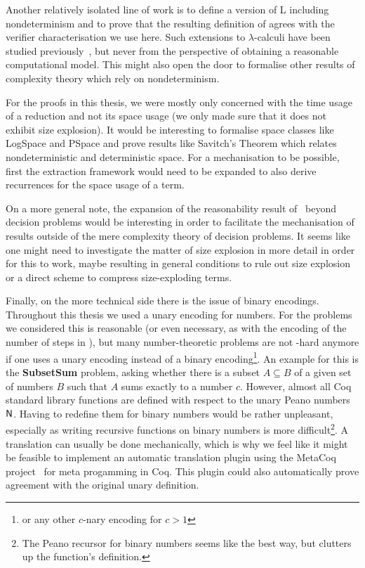 Another relatively isolated line of work is to define a version of L including nondeterminism and to prove that the resulting definition of \NP{} agrees with the verifier characterisation we use here. Such extensions to $\lambda$-calculi have been studied previously~\cite{kutzner:nondet_lambda}, but never from the perspective of obtaining a reasonable computational model. This might also open the door to formalise other results of complexity theory which rely on nondeterminism.

For the proofs in this thesis, we were mostly only concerned with the time usage of a reduction and not its space usage (we only made sure that it does not exhibit size explosion). It would be interesting to formalise space classes like \textsf{LogSpace} and \textsf{PSpace} and prove results like Savitch's Theorem which relates nondeterministic and deterministic space. For a mechanisation to be possible, first the extraction framework would need to be expanded to also derive recurrences for the space usage of a term.

On a more general note, the expansion of the reasonability result of~\cite{ForsterKunzeRoth:2019:wcbv-Reasonable} beyond decision problems would be interesting in order to facilitate the mechanisation of results outside of the mere complexity theory of decision problems. It seems like one might need to investigate the matter of size explosion in more detail in order for this to work, maybe resulting in general conditions to rule out size explosion or a direct scheme to compress size-exploding terms.

Finally, on the more technical side there is the issue of binary encodings. Throughout this thesis we used a unary encoding for numbers. For the problems we considered this is reasonable (or even necessary, as with the encoding of the number of steps in \gennp{}), but many number-theoretic problems are not \NP{}-hard anymore if one uses a unary encoding instead of a binary encoding\footnote{or any other $c$-nary encoding for $c> 1$}. An example for this is the \textbf{SubsetSum} problem, asking whether there is a subset $A \subseteq B$ of a given set of numbers $B$ such that $A$ sums exactly to a number $c$.
However, almost all Coq standard library functions are defined with respect to the unary Peano numbers $\mathsf{N}$.
Having to redefine them for binary numbers would be rather unpleasant, especially as writing recursive functions on binary numbers is more difficult\footnote{The Peano recursor for binary numbers seems like the best way, but clutters up the function's definition.}.
A translation can usually be done mechanically, which is why we feel like it might be feasible to implement an automatic translation plugin using the MetaCoq project~\cite{metacoq_web} for meta progamming in Coq. This plugin could also automatically prove agreement with the original unary definition.

